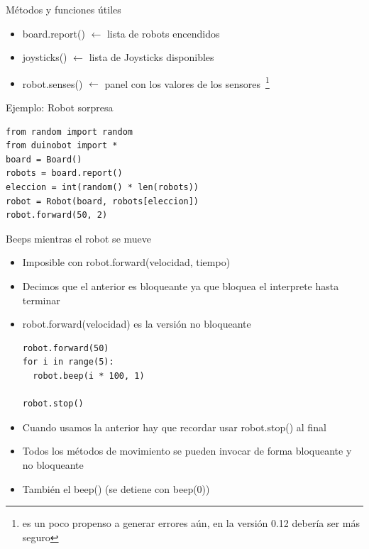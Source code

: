 \documentclass{beamer}[10]
\begin{document}
\begin{frame}[fragile]{Métodos y funciones útiles}
	\begin{itemize}
		\item board.report() $\leftarrow$ lista de robots encendidos
		\item joysticks() $\leftarrow$ lista de Joysticks disponibles
		\item robot.senses() $\leftarrow$ panel con los valores de los sensores~\footnote{es un poco propenso a generar errores aún, en la versión 0.12 debería ser más seguro}
	\end{itemize}\pause
	\begin{block}{Ejemplo: Robot sorpresa}
		\begin{lstlisting}
from random import random
from duinobot import *
board = Board()
robots = board.report()
eleccion = int(random() * len(robots))
robot = Robot(board, robots[eleccion])
robot.forward(50, 2)
		\end{lstlisting}
	\end{block}
\end{frame}
\begin{frame}
	\begin{center}
	\end{center}
\end{frame}
\begin{frame}[fragile]{Beeps mientras el robot se mueve}
	\begin{itemize}[<+->]
		\item Imposible con robot.forward(velocidad, tiempo)
		\item Decimos que el anterior es bloqueante ya que bloquea el interprete hasta terminar
		\item robot.forward(velocidad) es la versión no bloqueante
			\begin{block}{}
				\begin{lstlisting}
robot.forward(50)
for i in range(5):
  robot.beep(i * 100, 1)

robot.stop()
				\end{lstlisting}
			\end{block}
		\item Cuando usamos la anterior hay que recordar usar robot.stop() al final
		\item Todos los métodos de movimiento se pueden invocar de forma bloqueante y no bloqueante
		\item También el beep() (se detiene con beep(0))
	\end{itemize}
\end{frame}
\end{document}
